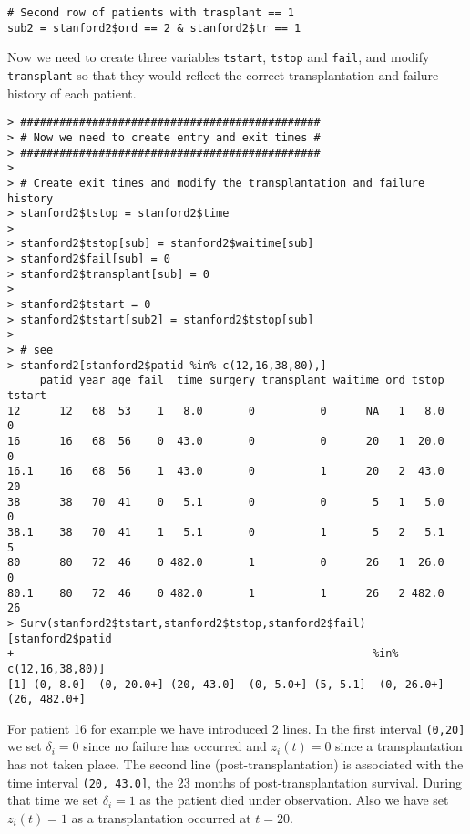 \begin{enumerate}[(a)]
\begin{enumerate}[(i)]
\begin{spacing}{1.2}
\begin{footnotesize}
\begin{verbatim}
# Second row of patients with trasplant == 1
sub2 = stanford2$ord == 2 & stanford2$tr == 1
\end{verbatim}
\end{footnotesize}
\end{spacing}
Now we need to create three variables \verb|tstart|, \verb|tstop| and \verb|fail|, and modify \verb|transplant| so that they would reflect the correct transplantation and failure history of each patient.
\begin{spacing}{1.2}
\begin{footnotesize}
\begin{verbatim}
> ##############################################
> # Now we need to create entry and exit times #
> ##############################################
> 
> # Create exit times and modify the transplantation and failure history
> stanford2$tstop = stanford2$time
> 
> stanford2$tstop[sub] = stanford2$waitime[sub]
> stanford2$fail[sub] = 0
> stanford2$transplant[sub] = 0
> 
> stanford2$tstart = 0
> stanford2$tstart[sub2] = stanford2$tstop[sub]
> 
> # see
> stanford2[stanford2$patid %in% c(12,16,38,80),]
     patid year age fail  time surgery transplant waitime ord tstop tstart
12      12   68  53    1   8.0       0          0      NA   1   8.0      0
16      16   68  56    0  43.0       0          0      20   1  20.0      0
16.1    16   68  56    1  43.0       0          1      20   2  43.0     20
38      38   70  41    0   5.1       0          0       5   1   5.0      0
38.1    38   70  41    1   5.1       0          1       5   2   5.1      5
80      80   72  46    0 482.0       1          0      26   1  26.0      0
80.1    80   72  46    0 482.0       1          1      26   2 482.0     26
> Surv(stanford2$tstart,stanford2$tstop,stanford2$fail)[stanford2$patid 
+                                                       %in% c(12,16,38,80)]
[1] (0, 8.0]  (0, 20.0+] (20, 43.0]  (0, 5.0+] (5, 5.1]  (0, 26.0+] (26, 482.0+]
\end{verbatim}
\end{footnotesize}
\end{spacing}
For patient 16 for example we have introduced 2 lines. In the first interval \verb|(0,20]| we set $\delta_{i}=0$ since no failure has occurred and $z_{i}(t)=0$ since a transplantation has not taken place. The second line
(post-transplantation) is associated with the time interval \verb|(20, 43.0]|, the 23 months of post-transplantation survival. During that time we set $\delta_{i}=1$ as the patient died under observation. Also we have set $z_{i}(t)=1$ as a transplantation occurred at $t=20$.


\end{enumerate}
\end{enumerate}

